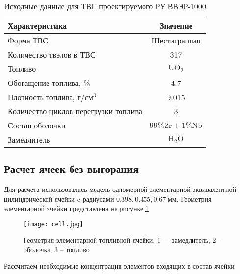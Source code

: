 \begin{table}[H]
	\caption{Исходные данные для ТВС проектируемого РУ ВВЭР-1000 }
	\begin{center}
        \begin{tabular}{|l|c|}
        \toprule
         Характеристика & Значение \\ 
         \midrule
          Форма ТВС & Шестигранная\\
         \hline
          Количество твэлов в ТВС & 317\\
         \hline
         Топливо & $\text{U}\text{O}_2$ \\
         \hline
         Обогащение топлива, \%& 4.7 \\
         \hline
         Плотность топлива, $\text{г}/\text{см}^3$ & 9.015 \\
         \hline
         Количество циклов перегрузки топлива & 3 \\
         \hline
         Состав оболочки & $99\% \text{Zr} + 1 \% \text{Nb}$ \\
         \hline
         Замедлитель & $\text{H}_2\text{O}$ \\
         \bottomrule
		\end{tabular}
		\label{tabular:neutron_in}
	\end{center}
\end{table}
\subsection{Расчет ячеек без выгорания}
Для расчета использовалась модель одномерной элементарной эквивалентной цилиндрической ячейки c радиусами $0.398, 0.455, 0.67$ мм. Геометрия элементарной ячейки представлена на рисунке \ref{pic:neutron_cell}

\begin{figure}[H]
	\begin{center}
		\texttt{[image: cell.jpg]}
		\caption{Геометрия элементарной топливной ячейки. 1 — замедлитель, 2 – оболочка, 3 – топливо}
		\label{pic:neutron_cell} %
	\end{center}
\end{figure}
Рассчитаем необходимые концентрации элементов входящих в состав ячейки

